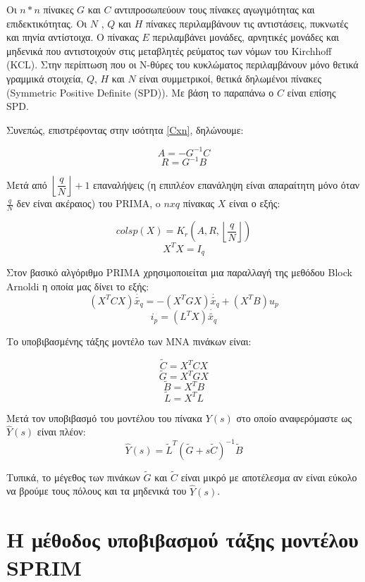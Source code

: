 Οι $n * n$ πίνακες $G$ και $C$ αντιπροσωπεύουν τους πίνακες αγωγιμότητας και επιδεκτικότητας. Οι $N$
, $Q$ και $H$ πίνακες περιλαμβάνουν τις αντιστάσεις, πυκνωτές και πηνία αντίστοιχα. Ο πίνακας $E$ περιλαμβάνει μονάδες, αρνητικές μονάδες και μηδενικά που αντιστοιχούν στις μεταβλητές ρεύματος των νόμων του  \textlatin{Kirchhoff (KCL)}. Στην περίπτωση που οι N-θύρες του κυκλώματος περιλαμβάνουν μόνο θετικά γραμμικά στοιχεία, $Q$, $H$ και $N$ είναι συμμετρικοί, θετικά δηλωμένοι πίνακες (\textlatin{Symmetric Positive Definite (SPD)}). Με βάση το παραπάνω ο $C$ είναι επίσης \textlatin{SPD}. 

Συνεπώς, επιστρέφοντας στην ισότητα \ref{Cxn}, δηλώνουμε:

\begin{equation}
    A = -G^{-1}C
\end{equation}
\begin{equation}
    R = G^{-1}B
\end{equation}


Μετά από $\left\lfloor\dfrac{q}{N}\right\rfloor +1$ επαναλήψεις (η επιπλέον επανάληψη είναι απαραίτητη μόνο όταν $\frac{q}{N}$ δεν είναι ακέραιος) του \textlatin{PRIMA}, o $n x q$ πίνακας $X$ είναι ο εξής:

\[
    colsp(X) = K_r(A, R,\left\lfloor\dfrac{q}{N}\right\rfloor)
\]
\[
    X^T X = I_q
\]

Στον βασικό αλγόριθμο \textlatin{PRIMA} χρησιμοποιείται μια παραλλαγή της μεθόδου \textlatin{Block Arnoldi} η οποία μας δίνει το εξής:
\[
    (X^T C X)\dot{\widetilde{x_q}} = - (X^T G X)\dot{\widetilde{x_q}} + (X^T B)u_p
\]
\[
    i_p = (L^TX)\dot{\widetilde{x_q}}
\]

Το υποβιβασμένης τάξης μοντέλο των \textlatin{MNA} πινάκων είναι:

\[
    \widetilde{C} = X^T C X
\]
\[
    \widetilde{G} = X^T G X
\]
\[
    \widetilde{B} = X^T B
\]
\[
    \widetilde{L} = X^T L
\]

Μετά τον υποβιβασμό του μοντέλου του πίνακα $Y(s)$ στο οποίο αναφερόμαστε ως $\hat{Y}(s)$ είναι πλέον:
\[
    \hat{Y}(s) = \widetilde{L}^T (\widetilde{G} + s \widetilde{C})^{-1} \widetilde{B}
\]

Τυπικά, το μέγεθος των πινάκων $\widetilde{G}$ και $\widetilde{C}$ είναι μικρό με αποτέλεσμα αν είναι εύκολο να βρούμε τους πόλους και τα μηδενικά του $\hat{Y}(s)$.

\section{Η μέθοδος υποβιβασμού τάξης μοντέλου \textlatin{SPRIM}}

